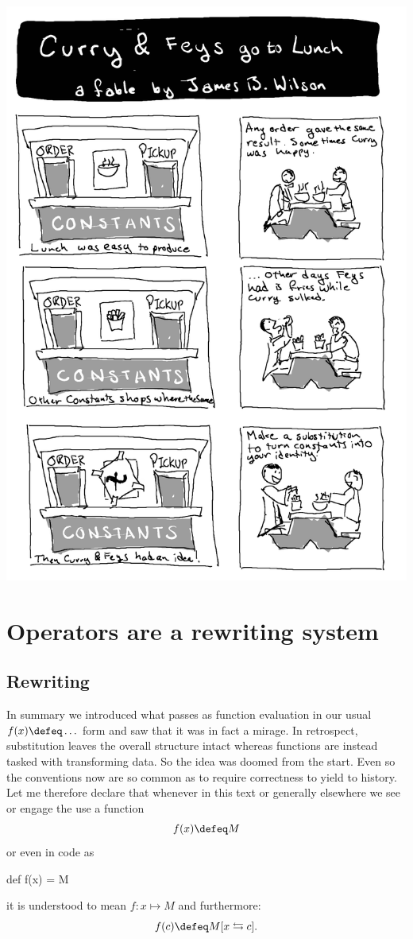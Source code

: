 
\cleardoublepage

\includegraphics[width=\textwidth]{curry-feys.png}

\chapter{Operators are a rewriting system}





% 

\section{Rewriting}
In summary we introduced what passes as function evaluation 
in our usual $f(x)\defeq \ldots$ form and saw that it was in fact 
a mirage.  In retrospect, substitution leaves the overall structure 
intact whereas functions are instead tasked with transforming data.
So the idea was doomed from the start.  Even so the conventions now 
are so common as to require correctness to yield to history.
Let me therefore declare that whenever in this text or generally 
elsewhere we see or engage the use a function
\[
    f(x)\defeq M
\]
or even in code as 
\begin{Pcode}[]
def f(x) = M
\end{Pcode}
it is understood to mean $f:x\mapsto M$ and furthermore:
\[
    f(c) \defeq M[x\leftrightarrows c].
\]

